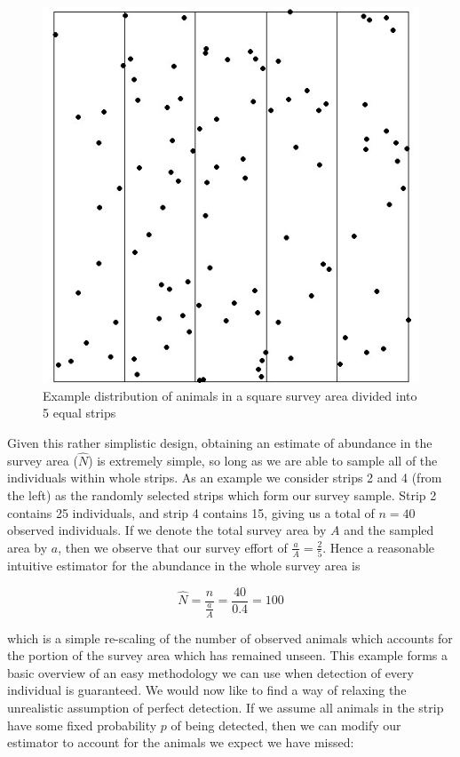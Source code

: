 \documentclass[11pt]{article}
\begin{document}
\begin{multicols}{2}
\begin{figure}[H]
\centering
\includegraphics[scale=0.5]{StripSampling}
\caption{Example distribution of animals in a square survey area divided into 5 equal strips}
\end{figure}

Given this rather simplistic design, obtaining an estimate of abundance in the survey area ($\hat{N}$) is extremely simple, so long as we are able to sample all of the individuals within whole strips. As an example we consider strips 2 and 4 (from the left) as the randomly selected strips which form our survey sample. Strip 2 contains 25 individuals, and strip 4 contains 15, giving us a total of $n=40$ observed individuals. If we denote the total survey area by $A$ and the sampled area by $a$, then we observe that our survey effort of $\frac{a}{A}=\frac{2}{5}$. Hence a reasonable intuitive estimator for the abundance in the whole survey area is

\begin{equation}
\hat{N}=\frac{n}{\frac{a}{A}}=\frac{40}{0.4}=100
\end{equation}

which is a simple re-scaling of the number of observed animals which accounts for the portion of the survey area which has remained unseen. This example forms a basic overview of an easy methodology we can use when detection of every individual is guaranteed. We would now like to find a way of relaxing the unrealistic assumption of perfect detection. If we assume all animals in the strip have some fixed probability $p$ of being detected, then we can modify our estimator to account for the animals we expect we have missed:


\end{multicols}
\end{document}
